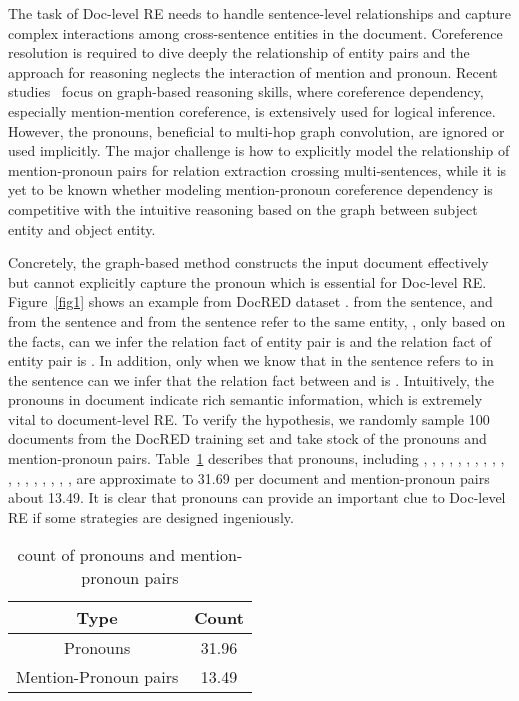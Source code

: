 \documentclass{article}
\begin{document}
The task of Doc-level RE needs to handle sentence-level relationships and capture complex interactions among cross-sentence entities in the document. Coreference resolution is required to dive deeply the relationship of entity pairs and the approach for reasoning neglects the interaction of mention and pronoun. Recent studies~\cite{ye2020coreferential,xu2021discriminative,huang2021graph} focus on graph-based reasoning skills, where coreference dependency, especially mention-mention coreference, is extensively used for logical inference. However, the pronouns, beneficial to multi-hop graph convolution, are ignored or used implicitly. The major challenge is how to explicitly model the relationship of mention-pronoun pairs for relation extraction crossing multi-sentences, while it is yet to be known whether modeling mention-pronoun coreference dependency is competitive with the intuitive reasoning based on the graph between subject entity and object entity.

Concretely, the graph-based method constructs the input document effectively but cannot explicitly capture the pronoun which is essential for Doc-level RE. Figure~\ref{fig1} shows an example from DocRED dataset \cite{yao2019docred}.    from the  sentence,  and  from the  sentence and  from the  sentence refer to the same entity,   , only based on the facts, can we infer the relation fact of entity pair  is    and the relation fact of entity pair  is   . In addition, only when we know that   in the  sentence refers to  in the  sentence can we infer that the relation fact between  and  is   . Intuitively, the pronouns in document indicate rich semantic information, which is extremely vital to document-level RE. To verify the hypothesis, we randomly sample 100 documents from the DocRED training set and take stock of the pronouns and mention-pronoun pairs. Table~\ref{tab1} describes that pronouns, including , , , , , , , , , , , , , , , , , , are approximate to 31.69 per document and mention-pronoun pairs about 13.49. It is clear that pronouns can provide an important clue to Doc-level RE if some strategies are designed ingeniously.

\begin{table}[ht]
    \centering
     \setlength{\belowcaptionskip}{-0.2cm}
    \begin{tabular}{c c}
    \hline
         Type&Count  \\\hline
         Pronouns&31.96  \\
         Mention-Pronoun pairs&13.49\\
         \hline
    \end{tabular}
    \caption{count of pronouns and mention-pronoun pairs}
    \label{tab1}
\end{table}
\end{document}
